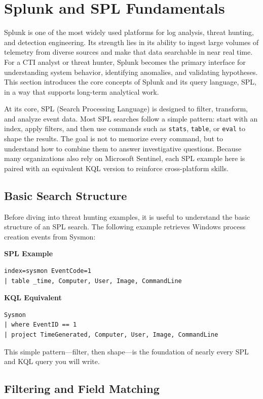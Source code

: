 \section{Splunk and SPL Fundamentals}

Splunk is one of the most widely used platforms for log analysis, threat hunting, and detection engineering. Its strength lies in its ability to ingest large volumes of telemetry from diverse sources and make that data searchable in near real time. For a CTI analyst or threat hunter, Splunk becomes the primary interface for understanding system behavior, identifying anomalies, and validating hypotheses. This section introduces the core concepts of Splunk and its query language, SPL, in a way that supports long-term analytical work.

At its core, SPL (Search Processing Language) is designed to filter, transform, and analyze event data. Most SPL searches follow a simple pattern: start with an index, apply filters, and then use commands such as \texttt{stats}, \texttt{table}, or \texttt{eval} to shape the results. The goal is not to memorize every command, but to understand how to combine them to answer investigative questions. Because many organizations also rely on Microsoft Sentinel, each SPL example here is paired with an equivalent KQL version to reinforce cross-platform skills.

\subsection*{Basic Search Structure}

Before diving into threat hunting examples, it is useful to understand the basic structure of an SPL search. The following example retrieves Windows process creation events from Sysmon:

\textbf{SPL Example}
\begin{lstlisting}
index=sysmon EventCode=1
| table _time, Computer, User, Image, CommandLine
\end{lstlisting}

\textbf{KQL Equivalent}
\begin{lstlisting}
Sysmon
| where EventID == 1
| project TimeGenerated, Computer, User, Image, CommandLine
\end{lstlisting}

This simple pattern—filter, then shape—is the foundation of nearly every SPL and KQL query you will write.

\subsection*{Filtering and Field Matching}

